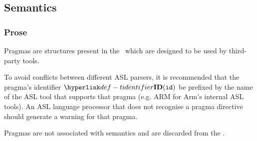 \subsection{Semantics\label{sec:PragmaSemantics}}

\subsubsection{Prose}
Pragmas are structures present in the \untypedast \ which are designed to be used
by third-party tools.

To avoid conflicts between different ASL parsers, it is recommended that the pragma's identifier $\Tidentifier(\id)$ be prefixed by the name of the ASL tool that supports that pragma
(e.g. ARM for Arm's internal ASL tools). An ASL language processor that does not recognise a pragma directive should generate a warning for that pragma.

Pragmas are not associated with semantics and are discarded from the \typedast.
